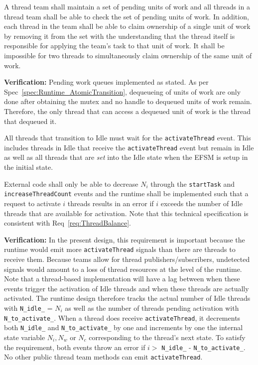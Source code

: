 \documentclass{article}
\begin{document}
\begin{spec}
A thread team shall maintain a set of pending units of work and all threads in a
thread team shall be able to check the set of pending units of work.  In
addition, each thread in the team shall be able to claim ownership of a single
unit of work by removing it from the set with the understanding that the thread
itself is responsible for applying the team's task to that unit of work.  It
shall be impossible for two threads to simultaneously claim ownership of the
same unit of work.
\end{spec}
\textbf{Verification:}\hspace{0.125in}  Pending work queues implemented as
stated.  As per Spec~\ref{spec:Runtime_AtomicTransition}, dequeueing of units of
work are only done after obtaining the mutex and no handle to dequeued units of
work remain.  Therefore, the only thread that can access a dequeued unit of work
is the thread that dequeued it.
\begin{spec}
All threads that transition to Idle must wait for the \texttt{activateThread}
event.  This includes threads in Idle that receive the \texttt{activateThread}
event but remain in Idle as well as all threads that are \textit{set} into the
Idle state when the EFSM is setup in the initial state.
\label{spec:IdleActivateThread}
\end{spec}

\begin{spec}
External code shall only be able to decrease $N_i$ through the
\texttt{startTask} and \texttt{increaseThreadCount} events and the runtime shall
be implemented such that a request to activate $i$ threads results in an error
if $i$ exceeds the number of Idle threads that are available for activation.
Note that this technical specification is consistent with
Req~\ref{req:ThreadBalance}.
\end{spec}
\textbf{Verification:}\hspace{0.125in}  In the present design, this requirement
is important because the runtime would emit more \texttt{activateThread} signals
than there are threads to receive them.  Because teams allow for thread
publishers/subscribers, undetected signals would amount to a loss of thread
resources at the level of the runtime.  Note that a thread-based implementation
will have a lag between when these events trigger the activation of Idle threads
and when these threads are actually activated.  The runtime design therefore
tracks the actual number of Idle threads with \texttt{N\_idle\_} = $N_i$ as well
as the number of threads pending activation with \texttt{N\_to\_activate\_}.
When a thread does receive \texttt{activateThread}, it decrements both
\texttt{N\_idle\_} and \texttt{N\_to\_activate\_} by one and increments by one
the internal state variable $N_i, N_w$ or $N_c$ corresponding to the thread's
next state.  To satisfy the requirement, both events throw an error if $i > $
\texttt{N\_idle\_} - \texttt{N\_to\_activate\_}.  No other public thread team
methods can emit \texttt{activateThread}.
\end{document}

